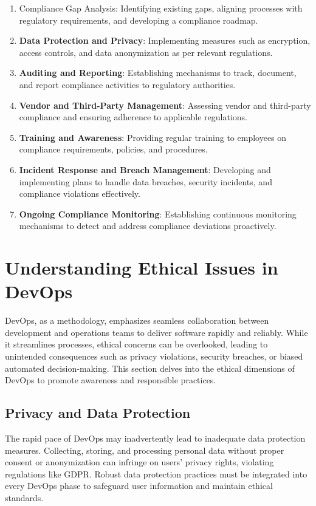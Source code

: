 \documentclass[conference]{IEEEtran}
\begin{document}
\begin{enumerate}
    \item Compliance Gap Analysis: Identifying existing gaps, aligning processes with regulatory requirements, and developing a compliance roadmap.

    \item \textbf{Data Protection and Privacy}: Implementing measures such as encryption, access controls, and data anonymization as per relevant regulations.

    \item \textbf{Auditing and Reporting}: Establishing mechanisms to track, document, and report compliance activities to regulatory authorities.

    \item \textbf{Vendor and Third-Party Management}: Assessing vendor and third-party compliance and ensuring adherence to applicable regulations.

    \item \textbf{Training and Awareness}: Providing regular training to employees on compliance requirements, policies, and procedures.

    \item \textbf{Incident Response and Breach Management}: Developing and implementing plans to handle data breaches, security incidents, and compliance violations effectively.

    \item \textbf{Ongoing Compliance Monitoring}: Establishing continuous monitoring mechanisms to detect and address compliance deviations proactively.
\end{enumerate}

\section{Understanding Ethical Issues in DevOps}

DevOps, as a methodology, emphasizes seamless collaboration between development and operations teams to deliver software rapidly and reliably. While it streamlines processes, ethical concerns can be overlooked, leading to unintended consequences such as privacy violations, security breaches, or biased automated decision-making. This section delves into the ethical dimensions of DevOps to promote awareness and responsible practices.

\subsection{Privacy and Data Protection}
The rapid pace of DevOps may inadvertently lead to inadequate data protection measures. Collecting, storing, and processing personal data without proper consent or anonymization can infringe on users' privacy rights, violating regulations like GDPR. Robust data protection practices must be integrated into every DevOps phase to safeguard user information and maintain ethical standards.
\end{document}
